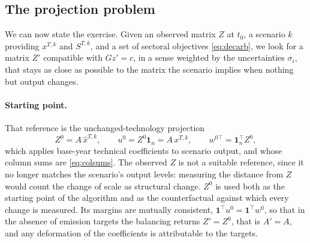 \documentclass[11pt,a4paper]{article}
\begin{document}
\subsection{The projection problem}
\label{sub:problem}

We can now state the exercise. Given an observed matrix $Z$ at $t_0$, a scenario $k$
providing $x^{T,k}$ and $S^{T,k}$, and a set of sectoral objectives \eqref{eq:decarb}, we look for a matrix $Z'$ compatible with $G z' = c$, in a sense weighted by the uncertainties $\sigma_i$, that stays as close as possible to the matrix the scenario implies when nothing but output changes.

\paragraph{Starting point.}
That reference is the unchanged-technology projection
\begin{equation}\label{eq:prior}
  Z^0 = A \, \hat{x}^{T,k},
  \qquad
  u^0 = Z^0 \mathbf{1}_n = A\,x^{T,k},
  \qquad
  w^{0\top} = \mathbf{1}_n^\top Z^0 ,
\end{equation}
which applies base-year technical coefficients to scenario output, and whose column sums are \eqref{eq:colsums}. The observed $Z$ is not a suitable reference, since it no longer matches the scenario's output levels: measuring the distance from $Z$ would count the change of scale as structural change. $Z^0$ is used both as the starting point of the algorithm and as the counterfactual against which every change is measured. Its margins are mutually consistent, $\mathbf{1}^\top u^0 = \mathbf{1}^\top w^0$, so that in the absence of emission targets the balancing returns $Z' = Z^0$, that is $A' = A$, and any deformation of the coefficients is attributable to the targets.
\end{document}

